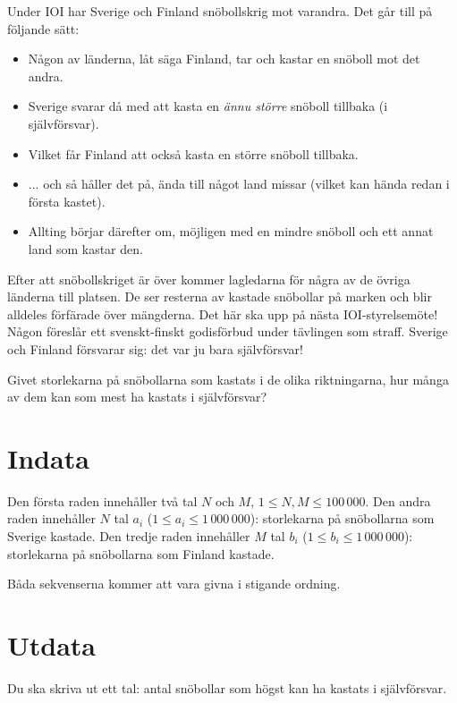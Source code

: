 
Under IOI har Sverige och Finland snöbollskrig mot varandra. Det går till på följande sätt:

\begin{itemize}
  \item Någon av länderna, låt säga Finland, tar och kastar en snöboll mot det andra.
  \item Sverige svarar då med att kasta en \emph{ännu större} snöboll tillbaka (i självförsvar).
  \item Vilket får Finland att också kasta en större snöboll tillbaka.
  \item ... och så håller det på, ända till något land missar (vilket kan hända redan i första kastet).
  \item Allting börjar därefter om, möjligen med en mindre snöboll och ett annat land som kastar den.
\end{itemize}

Efter att snöbollskriget är över kommer lagledarna för några av de övriga länderna till platsen.
De ser resterna av kastade snöbollar på marken och blir alldeles förfärade över mängderna.
Det här ska upp på nästa IOI-styrelsemöte! Någon föreslår ett svenskt-finskt godisförbud under tävlingen som straff.
Sverige och Finland försvarar sig: det var ju bara självförsvar!

Givet storlekarna på snöbollarna som kastats i de olika riktningarna, hur många av dem kan som mest ha kastats i självförsvar?

\section*{Indata}

Den första raden innehåller två tal $N$ och $M$, $1 \le N,M \le 100\,000$.
Den andra raden innehåller $N$ tal $a_i$ ($1 \le a_i \le 1\,000\,000$): storlekarna på snöbollarna som Sverige kastade.
Den tredje raden innehåller $M$ tal $b_i$ ($1 \le b_i \le 1\,000\,000$): storlekarna på snöbollarna som Finland kastade.

Båda sekvenserna kommer att vara givna i stigande ordning.

\section*{Utdata}

Du ska skriva ut ett tal: antal snöbollar som högst kan ha kastats i självförsvar.

